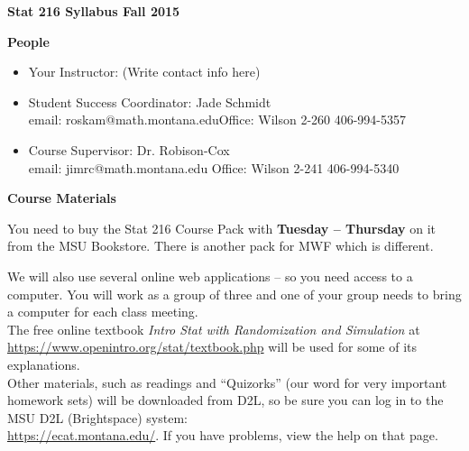 \setcounter{page}{1}

\def\theTopic{Intro \& Syllabus }
\def\dayNum{1}


\begin{center}
\vspace*{.1in}
{\bf {\large Stat 216 Syllabus Fall 2015}}\\
\end{center}
\vspace{-.1in}

\begin{center}
  {\bf People}
\end{center}
\begin{itemize}
\item Your Instructor: (Write contact info here) \vspace{5.5cm}
\item Student Success Coordinator:  Jade Schmidt\\
     email: roskam@math.montana.edu\hfill Office: Wilson 2-260 \hfill
     406-994-5357
   \item Course Supervisor: Dr. Robison-Cox\\
     email: jimrc@math.montana.edu \hfill  Office: Wilson 2-241 \hfill
     406-994-5340
\end{itemize}


\begin{center}
  {\bf Course Materials}
\end{center}
  You need to buy the Stat 216  Course Pack with {\bf Tuesday --
    Thursday} on it from the MSU
  Bookstore.  There is another pack for MWF which is different.

  We will also use several online web applications -- so you need
  access to a computer.  You will work as a group of three and one of
  your group needs to bring a computer for each class meeting.\\
  The free online textbook {\it Intro Stat with Randomization and
    Simulation} at \url{https://www.openintro.org/stat/textbook.php}
  will be used for some of its explanations.\\
  Other materials, such as readings and ``Quizorks'' (our word for
  very important homework sets) will be downloaded from D2L, so be
  sure you can log in to the MSU D2L (Brightspace) system:\\
   \url{https://ecat.montana.edu/}.  If you have problems, view the
   help on that page.
\newpage

